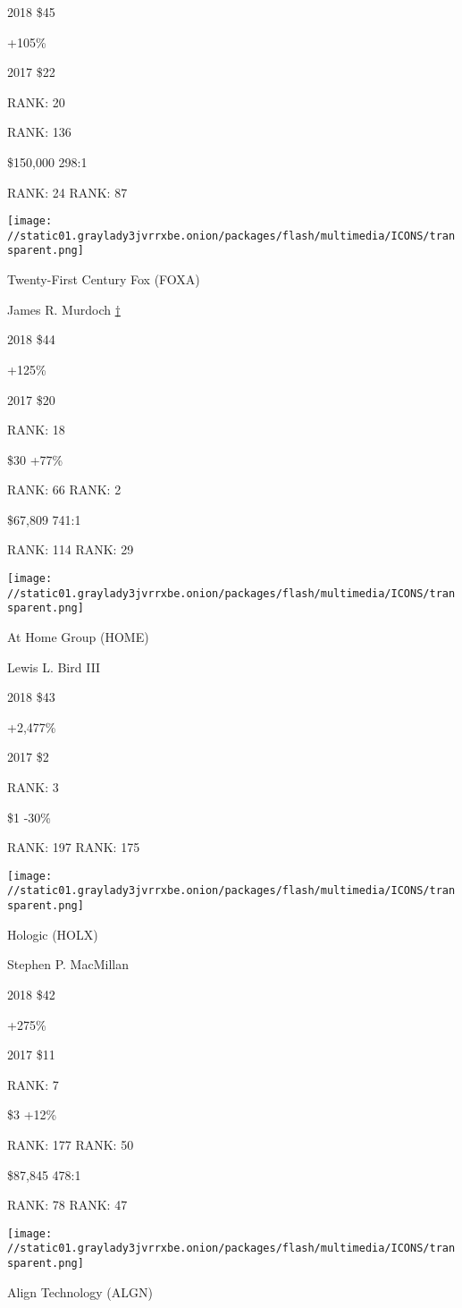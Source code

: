 2018 \$45

 +105\%

2017 \$22

RANK: 20

 RANK: 136

 \$150,000 298:1

RANK: 24 RANK: 87

\texttt{[image: //static01.graylady3jvrrxbe.onion/packages/flash/multimedia/ICONS/transparent.png]}

Twenty-First Century Fox (FOXA)

James R. Murdoch \protect\hyperlink{g-footnotes}{†}

2018 \$44

 +125\%

2017 \$20

RANK: 18

 \$30 +77\%

RANK: 66 RANK: 2

 \$67,809 741:1

RANK: 114 RANK: 29

\texttt{[image: //static01.graylady3jvrrxbe.onion/packages/flash/multimedia/ICONS/transparent.png]}

At Home Group (HOME)

Lewis L. Bird III \protect\hyperlink{g-footnotes}{}

2018 \$43

 +2,477\%

2017 \$2

RANK: 3

 \$1 -30\%

RANK: 197 RANK: 175

\texttt{[image: //static01.graylady3jvrrxbe.onion/packages/flash/multimedia/ICONS/transparent.png]}

Hologic (HOLX)

Stephen P. MacMillan \protect\hyperlink{g-footnotes}{}

2018 \$42

 +275\%

2017 \$11

RANK: 7

 \$3 +12\%

RANK: 177 RANK: 50

 \$87,845 478:1

RANK: 78 RANK: 47

\texttt{[image: //static01.graylady3jvrrxbe.onion/packages/flash/multimedia/ICONS/transparent.png]}

Align Technology (ALGN)

